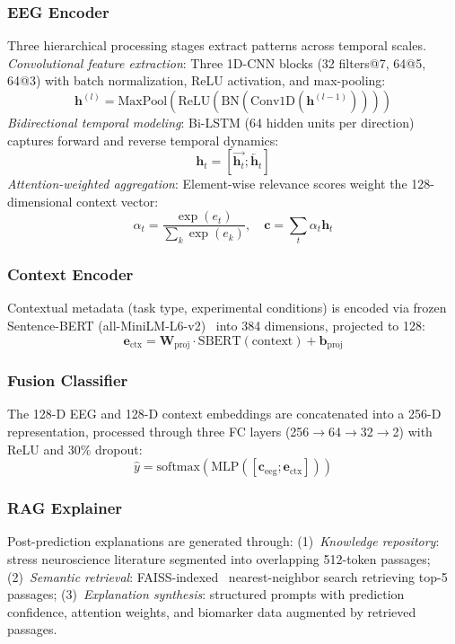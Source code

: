 \documentclass[journal,twoside]{IEEEtran}
\begin{document}
\subsubsection{EEG Encoder}
Three hierarchical processing stages extract patterns across temporal scales. \textit{Convolutional feature extraction}: Three 1D-CNN blocks (32 filters@7, 64@5, 64@3) with batch normalization, ReLU activation, and max-pooling:
\begin{equation}
\mathbf{h}^{(l)} = \text{MaxPool}(\text{ReLU}(\text{BN}(\text{Conv1D}(\mathbf{h}^{(l-1)}))))
\end{equation}
\textit{Bidirectional temporal modeling}: Bi-LSTM (64 hidden units per direction) captures forward and reverse temporal dynamics:
\begin{equation}
\mathbf{h}_t = [\overrightarrow{\mathbf{h}_t}; \overleftarrow{\mathbf{h}_t}]
\end{equation}
\textit{Attention-weighted aggregation}: Element-wise relevance scores weight the 128-dimensional context vector:
\begin{equation}
\alpha_t = \frac{\exp(e_t)}{\sum_{k} \exp(e_k)}, \quad \mathbf{c} = \sum_{t} \alpha_t \mathbf{h}_t
\end{equation}

\subsubsection{Context Encoder}
Contextual metadata (task type, experimental conditions) is encoded via frozen Sentence-BERT (all-MiniLM-L6-v2)~\cite{reimers2019sentence} into 384 dimensions, projected to 128:
\begin{equation}
\mathbf{e}_{\text{ctx}} = \mathbf{W}_{\text{proj}} \cdot \text{SBERT}(\text{context}) + \mathbf{b}_{\text{proj}}
\end{equation}

\subsubsection{Fusion Classifier}
The 128-D EEG and 128-D context embeddings are concatenated into a 256-D representation, processed through three FC layers (256$\to$64$\to$32$\to$2) with ReLU and 30\% dropout:
\begin{equation}
\hat{y} = \text{softmax}(\text{MLP}([\mathbf{c}_{\text{eeg}}; \mathbf{e}_{\text{ctx}}]))
\end{equation}

\subsubsection{RAG Explainer}
Post-prediction explanations are generated through: (1)~\textit{Knowledge repository}: stress neuroscience literature segmented into overlapping 512-token passages; (2)~\textit{Semantic retrieval}: FAISS-indexed~\cite{johnson2019billion} nearest-neighbor search retrieving top-5 passages; (3)~\textit{Explanation synthesis}: structured prompts with prediction confidence, attention weights, and biomarker data augmented by retrieved passages.
\end{document}
